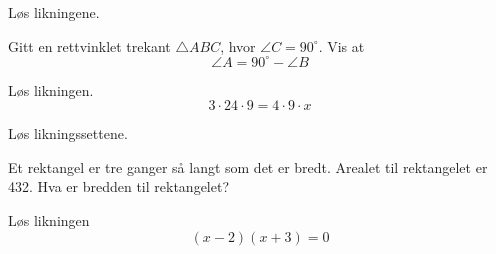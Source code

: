 Løs likningene. \os
{}\os
{}

Gitt en rettvinklet trekant $ \triangle ABC $, hvor $ \angle C = 90^\circ $. Vis at
\[ \angle A = 90^\circ- \angle B \]

Løs likningen.
\[ 3\cdot24\cdot9 = 4\cdot 9 \cdot x \]

\nes

\nes

\nes

Løs likningssettene. \os
{} \\ 
\vspace{12pt}

Et rektangel er tre ganger så langt som det er bredt. Arealet til rektangelet er 432. \os
Hva er bredden til rektangelet?

\newpage
{}
Løs likningen
\[ (x-2)(x+3)=0 \]

